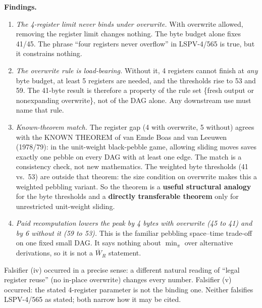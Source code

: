 \documentclass[11pt]{article}
\begin{document}
\textbf{Findings.}
\begin{enumerate}
\item \emph{The 4-register limit never binds under overwrite.}  With overwrite allowed, removing the register limit changes nothing.  The byte budget alone fixes 41/45.  The phrase ``four registers never overflow'' in LSPV-4/565 is true, but it constrains nothing.
\item \emph{The overwrite rule is load-bearing.}  Without it, 4 registers cannot finish at \emph{any} byte budget, at least 5 registers are needed, and the thresholds rise to 53 and 59.  The 41-byte result is therefore a property of the rule set \{fresh output or nonexpanding overwrite\}, not of the DAG alone.  Any downstream use must name that rule.
\item \emph{Known-theorem match.}  The register gap (4 with overwrite, 5 without) agrees with the KNOWN THEOREM of van Emde Boas and van Leeuwen (1978/79): in the unit-weight black-pebble game, allowing sliding moves saves exactly one pebble on every DAG with at least one edge.  The match is a consistency check, not new mathematics.  The weighted byte thresholds (41 vs.\ 53) are outside that theorem: the size condition on overwrite makes this a weighted pebbling variant.  So the theorem is a \textbf{useful structural analogy} for the byte thresholds and a \textbf{directly transferable theorem} only for unrestricted unit-weight sliding.
\item \emph{Paid recomputation lowers the peak by 4 bytes with overwrite (45 to 41) and by 6 without it (59 to 53).}  This is the familiar pebbling space--time trade-off on one fixed small DAG.  It says nothing about $\min_\pi$ over alternative derivations, so it is not a $\overline W_R$ statement.
\end{enumerate}
Falsifier (iv) occurred in a precise sense: a different natural reading of ``legal register reuse'' (no in-place overwrite) changes every number.  Falsifier (v) occurred: the stated 4-register parameter is not the binding one.  Neither falsifies LSPV-4/565 as stated; both narrow how it may be cited.
\end{document}
